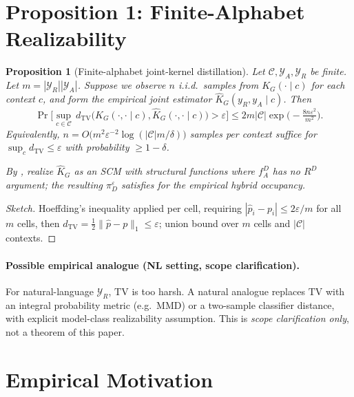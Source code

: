 \documentclass{article}
\theoremstyle{plain}
\newtheorem{proposition}[theorem]{Proposition}
\theoremstyle{definition}
\theoremstyle{remark}
\newcommand{\TV}{\mathrm{TV}}
\newcommand{\dtv}{d_{\TV}}
\newcommand{\C}{\mathcal{C}}
\newcommand{\YR}{\mathcal{Y}_R}
\newcommand{\YA}{\mathcal{Y}_A}
\begin{document}
\section{Proposition 1: Finite-Alphabet Realizability}\label{sec:prop-1}


\begin{proposition}[Finite-alphabet joint-kernel distillation]\label{prop:finite-alphabet}
Let $\C, \YA, \YR$ be finite. Let $m = |\YR| |\YA|$. Suppose we observe $n$
i.i.d.\ samples from $K_G(\cdot \mid c)$ for each context $c$, and form the
empirical joint estimator $\hat K_G(y_R, y_A \mid c)$. Then
\[
\Pr\Big[\sup_{c \in \C}\, \dtv\big(K_G(\cdot, \cdot \mid c), \hat K_G(\cdot, \cdot \mid c)\big) > \varepsilon\Big]
\le 2 m |\C| \exp\!\Big(-\tfrac{8 n \varepsilon^2}{m^2}\Big).
\]
Equivalently, $n = O\big(m^2 \varepsilon^{-2} \log(|\C| m / \delta)\big)$
samples per context suffice for $\sup_c \dtv \le \varepsilon$ with probability
$\ge 1 - \delta$.

By , realize $\hat K_G$ as an SCM with structural functions where
$f_A^D$ has no $R^D$ argument; the resulting $\pi_D^\varepsilon$ satisfies
 for the empirical hybrid occupancy.
\end{proposition}
\begin{proof}[Sketch]
Hoeffding's inequality applied per cell, requiring $|\hat p_i - p_i| \le 2\varepsilon/m$
for all $m$ cells, then $\dtv = \tfrac{1}{2}\|\hat p - p\|_1 \le \varepsilon$;
union bound over $m$ cells and $|\C|$ contexts.
\end{proof}

\paragraph{Possible empirical analogue (NL setting, scope clarification).}
For natural-language $\YR$, $\TV$ is too harsh. A natural analogue replaces
$\TV$ with an integral probability metric (e.g.\ MMD) or a two-sample classifier
distance, with explicit model-class realizability assumption. This is
\emph{scope clarification only}, not a theorem of this paper.

\section{Empirical Motivation}\label{sec:empirical}
\end{document}
